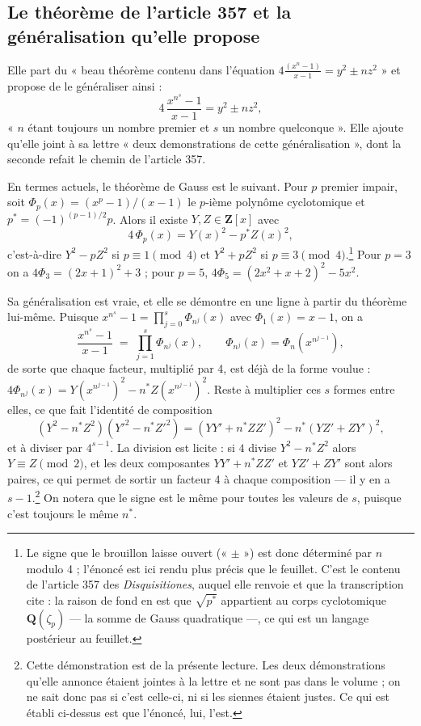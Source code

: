 \documentclass[11pt,a4paper]{article}
\begin{document}
\subsection*{Le théorème de l'article 357 et la généralisation qu'elle propose}

Elle part du « beau théorème contenu dans l'équation
$4\frac{(x^n-1)}{x-1} = y^2 \pm n z^2$ » et propose de le généraliser ainsi :
\[
  4\,\frac{x^{n^s}-1}{x-1} = y^2 \pm n z^2,
\]
« $n$ étant toujours un nombre premier et $s$ un nombre quelconque ». Elle
ajoute qu'elle joint à sa lettre « deux demonstrations de cette
généralisation », dont la seconde refait le chemin de l'article 357.

En termes actuels, le théorème de Gauss est le suivant. Pour $p$ premier
impair, soit $\Phi_p(x) = (x^p-1)/(x-1)$ le $p$-ième polynôme cyclotomique et
$p^{*} = (-1)^{(p-1)/2}p$. Alors il existe $Y, Z \in \mathbf{Z}[x]$ avec
\[
  4\,\Phi_p(x) = Y(x)^2 - p^{*}Z(x)^2 ,
\]
c'est-à-dire $Y^2 - pZ^2$ si $p \equiv 1 \pmod 4$ et $Y^2 + pZ^2$ si
$p \equiv 3 \pmod 4$.\footnote{Le signe que le brouillon laisse ouvert
(« $\pm$ ») est donc déterminé par $n$ modulo 4 ; l'énoncé est ici rendu plus
précis que le feuillet. C'est le contenu de l'article 357 des
\emph{Disquisitiones}, auquel elle renvoie et que la transcription cite : la
raison de fond en est que $\sqrt{p^{*}}$ appartient au corps cyclotomique
$\mathbf{Q}(\zeta_p)$ — la somme de Gauss quadratique —, ce qui est un langage
postérieur au feuillet.} Pour $p = 3$ on a $4\Phi_3 = (2x+1)^2 + 3$ ; pour
$p = 5$, $4\Phi_5 = (2x^2+x+2)^2 - 5x^2$.

Sa généralisation est vraie, et elle se démontre en une ligne à partir du
théorème lui-même. Puisque $x^{n^s} - 1 = \prod_{j=0}^{s}\Phi_{n^j}(x)$ avec
$\Phi_1(x) = x-1$, on a
\[
  \frac{x^{n^s}-1}{x-1} \;=\; \prod_{j=1}^{s}\Phi_{n^j}(x),
  \qquad \Phi_{n^j}(x) = \Phi_n\!\left(x^{n^{j-1}}\right),
\]
de sorte que chaque facteur, multiplié par 4, est déjà de la forme voulue :
$4\Phi_{n^j}(x) = Y\!\left(x^{n^{j-1}}\right)^2 - n^{*}Z\!\left(x^{n^{j-1}}\right)^2$.
Reste à multiplier ces $s$ formes entre elles, ce que fait l'identité de
composition
\[
  (Y^2 - n^{*}Z^2)(Y'^2 - n^{*}Z'^2)
  = (YY' + n^{*}ZZ')^2 - n^{*}(YZ' + ZY')^2 ,
\]
et à diviser par $4^{s-1}$. La division est licite : si $4$ divise $Y^2 -
n^{*}Z^2$ alors $Y \equiv Z \pmod 2$, et les deux composantes
$YY'+n^{*}ZZ'$ et $YZ'+ZY'$ sont alors paires, ce qui permet de sortir un
facteur 4 à chaque composition — il y en a $s-1$.\footnote{Cette démonstration
est de la présente lecture. Les deux démonstrations qu'elle annonce étaient
jointes à la lettre et ne sont pas dans le volume ; on ne sait donc pas si
c'est celle-ci, ni si les siennes étaient justes. Ce qui est établi ci-dessus
est que l'énoncé, lui, l'est.} On notera que le signe est le même pour toutes
les valeurs de $s$, puisque c'est toujours le même $n^{*}$.
\end{document}
